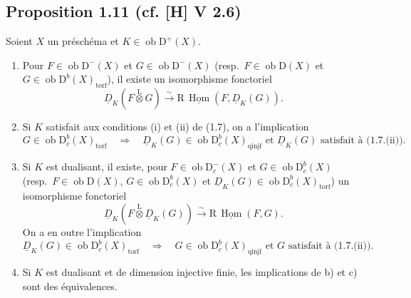 \documentclass[11pt]{article}
\DeclareMathOperator{\Hom}{Hom}
\newcommand{\R}{\mathrm{R}}
\newcommand{\D}{\mathrm{D}}
\newcommand{\ob}{\operatorname{ob}}
\providecommand{\Hom}{\operatorname{Hom}}
\providecommand{\ob}{\operatorname{ob}}
\providecommand{\R}{\mathrm R}
\providecommand{\Hom}{\operatorname{Hom}}
\begin{document}
\subsection*{Proposition 1.11 (cf. [H] V 2.6)}
Soient $X$ un préschéma et $K \in \ob \D^{+}(X)$.
\begin{enumerate}
\item[a)] Pour $F \in \ob \D^{-}(X)$ et $G \in \ob \D^{-}(X)$ (resp.~$F \in \ob \D(X)$ et $G \in \ob \D^{b}(X)_{\mathrm{torf}}$), il existe un isomorphisme fonctoriel
\[
\underline{D}_K(F \mathop{\otimes}\limits^{\mathrm{L}} G) \xrightarrow{\sim} \R\,\underline{\Hom}(F, \underline{D}_K(G)).
\]
\item[b)] Si $K$ satisfait aux conditions (i) et (ii) de (1.7), on a l'implication
\[
G \in \ob \D_c^{b}(X)_{\mathrm{torf}} \quad \Longrightarrow \quad \underline{D}_K(G) \in \ob \D_c^{b}(X)_{\mathrm{qinjf}} \text{ et } \underline{D}_K(G) \text{ satisfait à (1.7.(ii)).}
\]
\item[c)] Si $K$ est dualisant, il existe, pour $F \in \ob \D_c^{-}(X)$ et $G \in \ob \D_c^{b}(X)$ (resp.~$F \in \ob \D(X)$, $G \in \ob \D_c^{b}(X)$ et $\underline{D}_K(G) \in \ob \D_c^{b}(X)_{\mathrm{torf}}$) un isomorphisme fonctoriel
\[
\underline{D}_K(F \mathop{\otimes}\limits^{\mathrm{L}} \underline{D}_K(G)) \xrightarrow{\sim} \R\,\underline{\Hom}(F, G).
\]
On a en outre l'implication
\[
\underline{D}_K(G) \in \ob \D_c^{b}(X)_{\mathrm{torf}} \quad \Longrightarrow \quad G \in \ob \D_c^{b}(X)_{\mathrm{qinjf}} \text{ et } G \text{ satisfait à (1.7.(ii)).}
\]
\item[d)] Si $K$ est dualisant et de dimension injective finie, les implications de b) et c) sont des équivalences.
\end{enumerate}
\end{document}
